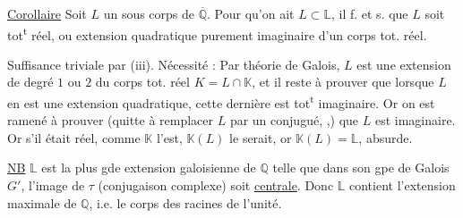 \uline{Corollaire} Soit $L$ un sous corps de $\overline{\mathbb Q}$. Pour qu'on ait
$L\subset\mathbb L$, il f. et s. que $L$ soit tot\textsuperscript{t} réel, ou extension
quadratique purement imaginaire d'un corps tot. réel.

Suffisance triviale par (iii). Nécessité : Par théorie
de Galois, $L$ est une extension de degré $1$ ou $2$
du corps tot. réel $K=L\cap\mathbb K$, et il reste à
prouver que lorsque $L$ en est une extension
quadratique, cette dernière est tot\textsuperscript{t} imaginaire.
 Or  on est ramené à prouver
(quitte à remplacer $L$ par un conjugué, ,) que $L$ est
imaginaire. Or s'il était réel, comme $\mathbb K$ l'est, $\mathbb K(L)$ le
serait, or $\mathbb K(L)=\mathbb L$, absurde.

\uline{NB} $\mathbb L$ est la plus gde extension galoisienne de $\mathbb Q$ telle
que dans son gpe de Galois $G'$, l'image de $\tau$ (conjugaison complexe) soit \uline{centrale}. Donc $\mathbb L$ contient l'extension 
maximale de $\mathbb Q$, i.e. le corps des
racines de l'unité.
